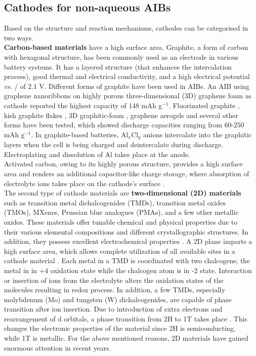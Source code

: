 \subsection{Cathodes for non-aqueous AIBs}
Based on the structure and reaction mechanisms, cathodes can be categorised in two ways.\\
\textbf{Carbon-based materials} have a high surface area. Graphite, a form of carbon with hexagonal structure, has been commonly used as an electrode in various battery systems. It has a layered structure (that enhances the intercalation process), good thermal and electrical conductivity, and a high electrical potential \textit{vs.} / of 2.1 V. Different forms of graphite have been used in AIBs. An AIB using graphene nanoribbons on highly porous three-dimensional (3D) graphene foam as cathode reported the highest capacity of 148 mAh g$^{-1}$. Fluorinated graphite \cite{rani_fluorinated_2013}, kish graphite flakes \cite{wang_kish_2017-1}, 3D graphitic-foam \cite{wu_3d_2016}, graphene aerogels\cite{huang_graphene_2019} and several other forms have been tested, which showed discharge capacities ranging from 60-250 mAh g$^{-1}$. In graphite-based batteries, Al$_x$Cl$_y$ anions intercalate into the graphitic layers when the cell is being charged and deintercalate during discharge. Electroplating and dissolution of Al takes place at the anode.\\
Activated carbon, owing to its highly porous structure, provides a high surface area and renders an additional capacitor-like charge storage, where absorption of electrolyte ions takes place on the cathode's surface \cite{eliad_ion_2001, zhu_carbon-based_2011-2}.\\
The second type of cathode materials are \textbf{two-dimensional (2D) materials} such as transition metal dichalcogenides (TMDs), transition metal oxides (TMOs), MXenes, Prussian blue analogues (PMAs), and a few other metallic oxides. These materials offer tunable chemical and physical properties due to their various elemental compositions and different crystallographic structures. In addition, they possess excellent electrochemical properties \cite{chia_electrochemistry_2015}. A 2D plane imparts a high surface area, which allows complete utilization of all available sites in a cathode material \cite{jia_interfacial_2016,naguib_mxene_2012}. Each metal in a TMD is coordinated with two chalcogens; the metal in in +4 oxidation state while the chalcogen atom is in -2 state. Interaction or insertion of ions from the electrolyte alters the oxidation states of the molecules resulting in redox process. In addition, a few TMDs, especially molybdenum (Mo) and tungsten (W) dichalcogenides, are capable of phase transition after ion insertion. Due to introduction of extra electrons and rearrangement of d orbitals, a phase transition from 2H to 1T takes place \cite{acerce_metallic_2015}. This changes the electronic properties of the material since 2H  is semiconducting, while 1T  is metallic. For the above mentioned reasons, 2D materials have gained enormous attention in recent years. 
